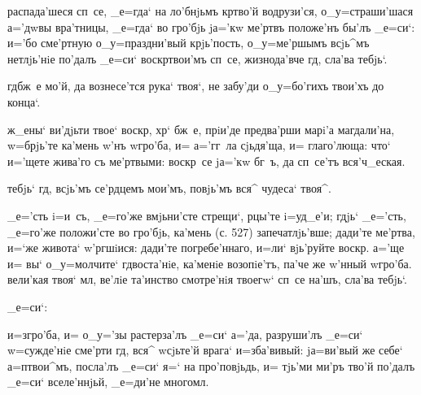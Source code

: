  распада'шеся сп~се, _е=гда` на ло'бнjьмъ 
кр тво'й водрузи'ся, о_у=страши'шася а='дwвы 
вра'тницы, _е=гда` во гро'бjь jа='кw ме'ртвъ положе'нъ 
бы'лъ _е=си`: и='бо сме'ртную о_у=праздни'вый крjь'пость, 
о_у=ме'ршымъ всjь^мъ нетлjь'нiе по'далъ _е=си` 
воскр твои'мъ сп~се, жизнода'вче гд, сла'ва 
тебjь`.

  гд бж~е мо'й, да вознесе'тся 
рука` твоя`, не забу'ди о_у=бо'гихъ твои'хъ до конца`.

 ж_ены` ви'дjьти твое` воскр, 
хр` бж~е, прiи'де предва'рши марi'а магдали'на, 
w=брjь'те ка'мень w'нъ w\т гро'ба, и= а='гг~ла 
сjьдя'ща, и= глаго'люща: что` и='щете жива'го съ 
ме'ртвыми: воскр~се jа='кw бг~ъ, да сп~се'тъ вся'ч_еская.

  тебjь` гд, всjь'мъ 
се'рдцемъ мои'мъ, повjь'мъ вся^ чудеса` твоя^.

 _е='сть i=и~съ, _е=го'же вмjьни'сте стрещи`, 
рцы'те i=уд_е'и; гдjь` _е='сть, _е=го'же положи'сте во 
гро'бjь, ка'мень (с. 527) запечатлjь'вше; дади'те 
ме'ртва, и=`же живота` w'ргшiися: дади'те 
погребе'ннаго, и=ли` вjь'руйте воскр. а='ще и= вы` 
о_у=молчите` гд воста'нiе, ка'менiе возопiе'тъ, па'че 
же w'нный w\т гро'ба. вели'кая твоя` мл, ве'лiе 
та'инство смотре'нiя твоегw` сп~се на'шъ, сла'ва тебjь`.

        _е=си`: 

 и=з\ъ гро'ба, и= о_у='зы растерза'лъ 
_е=си` а='да, разруши'лъ _е=си` w=сужде'нiе сме'рти 
гд, вся^ w\т сjьте'й врага` и=зба'вивый: jа=ви'вый же 
себе` а=п твои^мъ, посла'лъ _е=си` я=` на 
про'повjьдь, и= тjь'ми ми'ръ тво'й по'далъ _е=си` 
вселе'ннjьй, _е=ди'не многомл.

